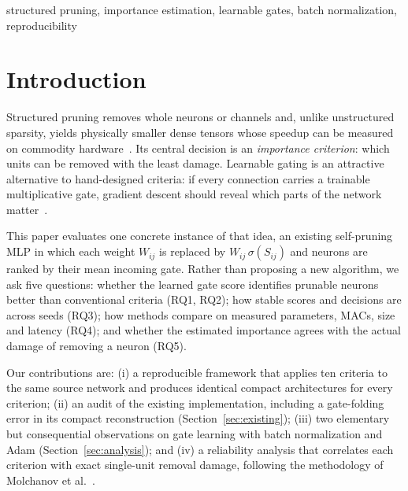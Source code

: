 \documentclass[conference]{IEEEtran}
\begin{document}
\begin{IEEEkeywords}
structured pruning, importance estimation, learnable gates, batch normalization,
reproducibility
\end{IEEEkeywords}

\section{Introduction}
Structured pruning removes whole neurons or channels and, unlike unstructured
sparsity, yields physically smaller dense tensors whose speedup can be measured on
commodity hardware~\cite{li2017filters,he2024survey}. Its central decision is an
\emph{importance criterion}: which units can be removed with the least damage.
Learnable gating is an attractive alternative to hand-designed criteria: if every
connection carries a trainable multiplicative gate, gradient descent should reveal
which parts of the network matter~\cite{louizos2018l0,lee2019snip}.

This paper evaluates one concrete instance of that idea, an existing
self-pruning MLP in which each weight $W_{ij}$ is replaced by
$W_{ij}\,\sigma(S_{ij})$ and neurons are ranked by their mean incoming gate. Rather than
proposing a new algorithm, we ask five questions: whether the learned gate score
identifies prunable neurons better than conventional criteria (RQ1, RQ2); how stable
scores and decisions are across seeds (RQ3); how methods compare on measured
parameters, MACs, size and latency (RQ4); and whether the estimated importance
agrees with the actual damage of removing a neuron (RQ5).

Our contributions are: (i) a reproducible framework that applies ten criteria to the
same source network and produces identical compact architectures for every criterion;
(ii) an audit of the existing implementation, including a gate-folding error in its
compact reconstruction (Section~\ref{sec:existing}); (iii) two elementary but
consequential observations on gate learning with batch normalization and Adam
(Section~\ref{sec:analysis}); and (iv) a reliability analysis that correlates each
criterion with exact single-unit removal damage, following the methodology of
Molchanov et al.~\cite{molchanov2019importance}.

\end{document}
